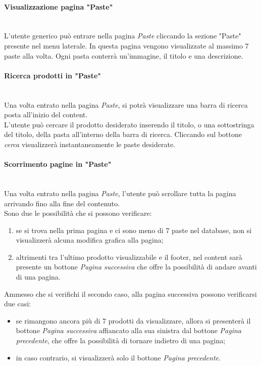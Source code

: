 \paragraph{Visualizzazione pagina "Paste"}\mbox{}\\
\label{par:VisPaste}
L'utente generico può entrare nella pagina \emph{Paste} cliccando la sezione "Paste" presente nel menu laterale.
In questa pagina vengono visualizzate al massimo 7 paste alla volta. Ogni pasta conterrà un'immagine, il titolo e una descrizione.\\ 

\paragraph{Ricerca prodotti in "Paste"}\mbox{}\\
\label{par:CerPaste}
Una volta entrato nella pagina \emph{Paste}, si potrà visualizzare una barra di ricerca posta all'inizio del content.\\
L'utente può cercare il prodotto desiderato inserendo il titolo, o una sottostringa del titolo, della pasta all'interno della barra di ricerca. Cliccando sul bottone 
\emph{cerca} visualizzerà instantaneamente le paste desiderate.

\paragraph{Scorrimento pagine in "Paste"}\mbox{}\\
\label{par:PrevNextPaste}
Una volta entrato nella pagina \emph{Paste}, l'utente può scrollare tutta la pagina arrivando fino alla fine del contenuto.\\
Sono due le possibilità che si possono verificare:
\begin{enumerate}
	\item se si trova nella prima pagina e ci sono meno di 7 paste nel database, non si visualizzerà alcuna modifica grafica alla pagina;
	\item altrimenti tra l'ultimo prodotto visualizzabile e il footer, nel content sarà presente un bottone \emph{Pagina successiva} che offre la possibilità di andare avanti 
	di una pagina.
\end{enumerate}	
Ammesso che si verifichi il secondo caso, alla pagina successiva possono verificarsi due casi:
\begin{itemize}
	\item se rimangono ancora più di 7 prodotti da visualizzare, allora si presenterà il bottone \emph{Pagina successiva} affiancato alla sua sinistra dal 
	bottone \emph{Pagina precedente}, che offre la possibilità di tornare indietro di una pagina;
	\item in caso contrario, si visualizzerà solo il bottone \emph{Pagina precedente}.
\end{itemize}	

